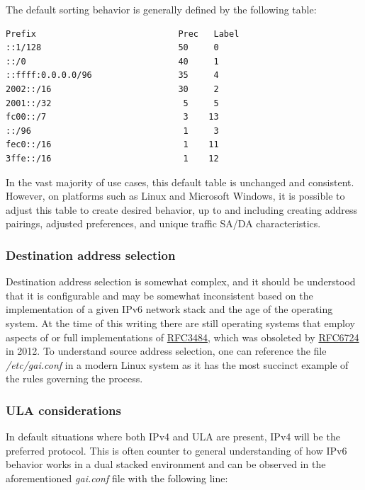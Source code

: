 \documentclass[
]{article}
\begin{document}
The default sorting behavior is generally defined by the following
table:

\begin{verbatim}
Prefix                            Prec   Label      
::1/128                           50     0    
::/0                              40     1  
::ffff:0.0.0.0/96                 35     4   
2002::/16                         30     2        
2001::/32                          5     5        
fc00::/7                           3    13   
::/96                              1     3       
fec0::/16                          1    11        
3ffe::/16                          1    12        
\end{verbatim}

In the vast majority of use cases, this default table is unchanged and
consistent. However, on platforms such as Linux and Microsoft Windows,
it is possible to adjust this table to create desired behavior, up to
and including creating address pairings, adjusted preferences, and
unique traffic SA/DA characteristics.

\subsubsection{Destination address
selection}\label{destination-address-selection}

Destination address selection is somewhat complex, and it should be
understood that it is configurable and may be somewhat inconsistent
based on the implementation of a given IPv6 network stack and the age of
the operating system. At the time of this writing there are still
operating systems that employ aspects of or full implementations of
\href{https://www.rfc-editor.org/info/rfc3484}{RFC3484}, which was
obsoleted by \href{https://www.rfc-editor.org/info/rfc6724}{RFC6724} in
2012. To understand source address selection, one can reference the file
\emph{/etc/gai.conf} in a modern Linux system as it has the most
succinct example of the rules governing the process.

\subsubsection{ULA considerations}\label{ula-considerations}

In default situations where both IPv4 and ULA are present, IPv4 will be
the preferred protocol. This is often counter to general understanding
of how IPv6 behavior works in a dual stacked environment and can be
observed in the aforementioned \emph{gai.conf} file with the following
line:
\end{document}
